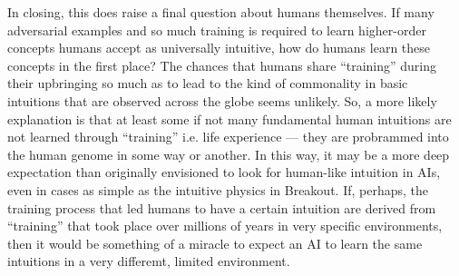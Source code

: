 \documentclass{article}
\begin{document}
In closing, this does raise a final question about humans themselves.
If many adversarial examples and so much training is required to learn higher-order concepts humans accept as universally intuitive, how do humans learn these concepts in the first place?
The chances that humans share ``training'' during their upbringing so much as to lead to the kind of commonality in basic intuitions that are observed across the globe seems unlikely.
So, a more likely explanation is that at least some if not many fundamental human intuitions are not learned through ``training'' i.e. life experience --- they are probrammed into the human genome in some way or another.
In this way, it may be a more deep expectation than originally envisioned to look for human-like intuition in AIs, even in cases as simple as the intuitive physics in Breakout.
If, perhaps, the training process that led humans to have a certain intuition are derived from ``training'' that took place over millions of years in very specific environments, then it would be something of a miracle to expect an AI to learn the same intuitions in a very differemt, limited environment.
\end{document}
